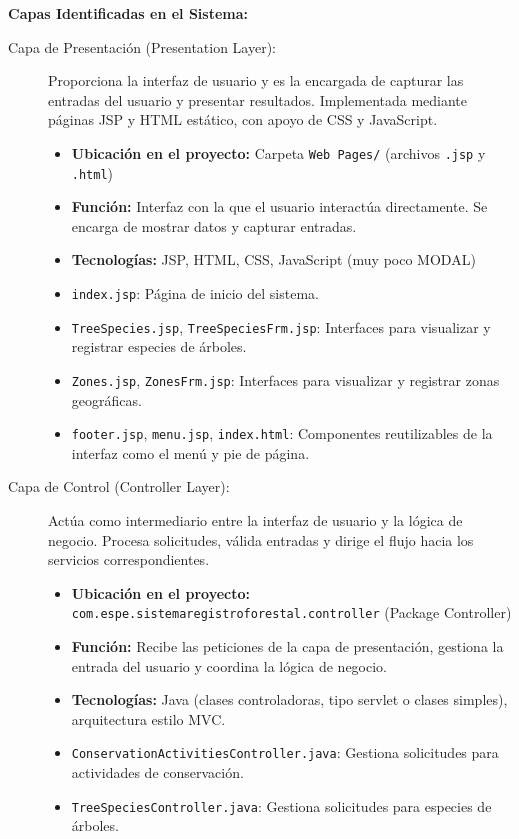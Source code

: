 \textbf{Capas Identificadas en el Sistema:}
\begin{description}
    \item[Capa de Presentación (Presentation Layer):] Proporciona la interfaz de usuario y es la encargada de capturar las entradas del usuario y presentar resultados. Implementada mediante páginas JSP y HTML estático, con apoyo de CSS y JavaScript.
    \begin{itemize}
        \item \textbf{Ubicación en el proyecto:} Carpeta \texttt{Web Pages/} (archivos \texttt{.jsp} y \texttt{.html})
        \item \textbf{Función:} Interfaz con la que el usuario interactúa directamente. Se encarga de mostrar datos y capturar entradas.
        \item \textbf{Tecnologías:} JSP, HTML, CSS, JavaScript (muy poco MODAL)
        \item \texttt{index.jsp}: Página de inicio del sistema.
        \item \texttt{TreeSpecies.jsp}, \texttt{TreeSpeciesFrm.jsp}: Interfaces para visualizar y registrar especies de árboles.
        \item \texttt{Zones.jsp}, \texttt{ZonesFrm.jsp}: Interfaces para visualizar y registrar zonas geográficas.
        \item \texttt{footer.jsp}, \texttt{menu.jsp}, \texttt{index.html}: Componentes reutilizables de la interfaz como el menú y pie de página.
    \end{itemize}
    \item[Capa de Control (Controller Layer):] Actúa como intermediario entre la interfaz de usuario y la lógica de negocio. Procesa solicitudes, válida entradas y dirige el flujo hacia los servicios correspondientes.
    \begin{itemize}
        \item \textbf{Ubicación en el proyecto:} \texttt{com.espe.sistemaregistroforestal.controller} (Package Controller)
        \item \textbf{Función:} Recibe las peticiones de la capa de presentación, gestiona la entrada del usuario y coordina la lógica de negocio.
        \item \textbf{Tecnologías:} Java (clases controladoras, tipo servlet o clases simples), arquitectura estilo MVC.
        \item \texttt{ConservationActivitiesController.java}: Gestiona solicitudes para actividades de conservación.
        \item \texttt{TreeSpeciesController.java}: Gestiona solicitudes para especies de árboles.

\end{itemize}
\end{description}
